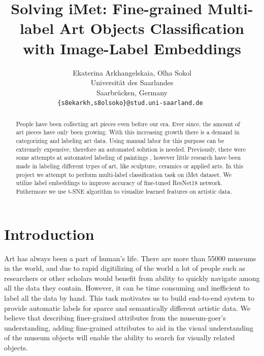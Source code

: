 \documentclass[10pt,twocolumn,letterpaper]{article}
\begin{document}
\title{Solving iMet: Fine-grained Multi-label Art Objects Classification with Image-Label Embeddings}

\author{Ekaterina Arkhangelskaia, Olha Sokol\\
Universit{\"a}t des Saarlandes\\
Saarbr{\"u}cken, Germany\\
{\tt\small \{s8ekarkh,s8olsoko\}@stud.uni-saarland.de }
}

\maketitle

\begin{abstract}
   People have been collecting art pieces even before our era. Ever since, the amount of art pieces have only been growing. With this increasing growth there is a demand in categorizing and labeling art data. Using manual labor for this purpose can be extremely expensive, therefore an automated solution is needed. Previously, there were some attempts at automated labeling of paintings \cite{Rijks}, however little research have been made in labeling different types of art, like sculpture, ceramics or applied arts. 
   In this project we attempt to perform multi-label classification task on iMet dataset. We utilize label embeddings to improve accuracy of fine-tuned ResNet18 network. Futhermore we use t-SNE algorithm to visualize learned features on artistic data. 

\end{abstract}

\section{Introduction}
Art has always been a part of human's life. There are more than 55000 museums in the world, and due to rapid digitilizing of the world a lot of people such as researchers or other scholars would benefit from ability to quickly  navigate among all the data they contain. However, it can be time consuming and inefficient to label all the data by hand. This task motivates us to build end-to-end system to provide automatic labels for sparce and semantically different artistic data. We believe that describing finer-grained attributes from the museum-goer’s understanding, adding fine-grained attributes to aid in the visual understanding of the museum objects will enable the ability to search for visually related objects. 
\end{document}
